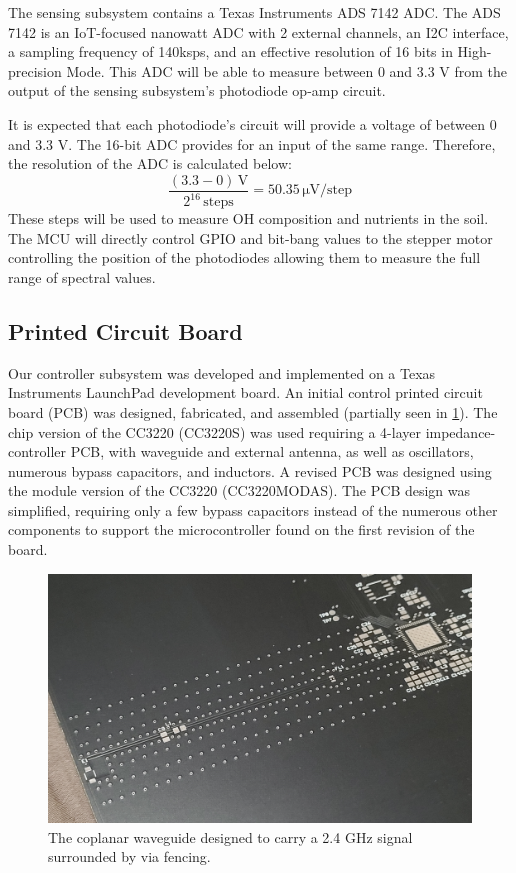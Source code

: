 \documentclass[journal]{IEEEtran}
\begin{document}
The sensing subsystem contains a Texas Instruments ADS 7142 ADC. The ADS 7142 is an IoT-focused nanowatt ADC with 2 external channels, an I2C interface, a sampling frequency of 140ksps, and an effective resolution of 16 bits in High-precision Mode. This ADC will be able to measure between 0 and 3.3 V from the output of the sensing subsystem's  photodiode op-amp circuit.

It is expected that each photodiode's circuit will provide a voltage of between 0 and 3.3 V. The 16-bit ADC provides for an input of the same range. Therefore, the resolution of the ADC is calculated below:
\begin{equation}
    \frac{(3.3 - 0)\,\mathrm{V}}{2^{16}\,\mathrm{steps}} =
    50.35\,\mathrm{\mu V}/\mathrm{step}
\end{equation}
These steps will be used to measure OH composition and nutrients in the soil. The MCU will directly control GPIO and bit-bang values to the stepper motor controlling the position of the photodiodes allowing them to measure the full range of spectral values.
\subsection{Printed Circuit Board} Our controller subsystem was developed and implemented on a Texas Instruments LaunchPad development board. An initial control printed circuit board (PCB) was designed, fabricated, and assembled (partially seen in \ref{fig:mcu_v1_cpwg}). The chip version of the CC3220 (CC3220S) was used requiring a 4-layer impedance-controller PCB, with waveguide and external antenna, as well as oscillators, numerous bypass capacitors, and inductors. A revised PCB was designed using the module version of the CC3220 (CC3220MODAS). The PCB design was simplified, requiring only a few bypass capacitors instead of the numerous other components to support the microcontroller found on the first revision of the board.

\begin{figure}[H]
    \centering
    \label{fig:mcu_v1_cpwg}
    \includegraphics[width=\linewidth]{images/mcu_v1_cpwg.jpg}
    \caption{The coplanar waveguide designed to carry a 2.4 GHz signal surrounded by via fencing.}
\end{figure}
\end{document}
